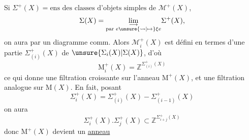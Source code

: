 Si $\Sigma^+(X)=\text{ens des classes d'objets simples}$
de $\mathcal{M}^+(X)$,
\[
\Sigma(X)=\underset{\substack{\longrightarrow\\
\text{par }e\unsure{\rightsquigarrow|\mapsto}\xi e}}{\lim}\Sigma^+(X),
\]
on aura par  un diagramme comm.
Alors $\mathcal{M}_i^+(X)$ est défini en termes
d'une partie $\Sigma_{(i)}^+(X)$ de
$\unsure{\Sigma_i(X)|\Sigma(X)}$,
d'où
\[
\mathrm{M}_i^+(X)=\mathbb{Z}^{\Sigma_{(i)}^+(X)}
\]
ce qui donne une filtration croissante
sur l'anneau $\mathrm{M}^+(X)$, et une
filtration analogue sur $\mathrm{M}(X)$.
En fait, posant
\[
\Sigma_i^+(X)=\Sigma_{(i)}^+(X)-\Sigma_{(i-1)}^+(X)
\]
on aura 
\[
\Sigma_i^+(X).\Sigma_j^+(X)\subset
\mathbb{Z}^{\Sigma_{i+j}^+(X)}
\]
donc $\mathrm{M}^+(X)$ devient un \uline{anneau}
